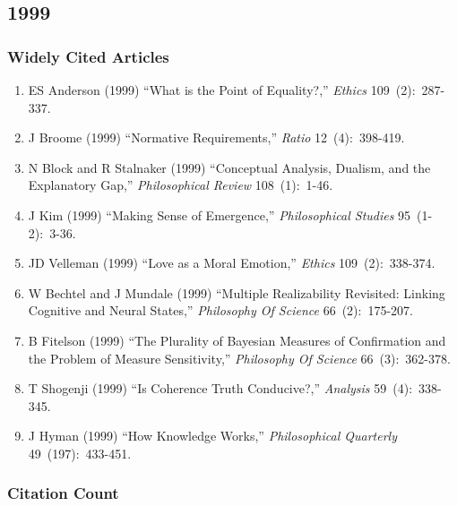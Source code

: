 \documentclass[
  10pt,
  letterpaper,
  DIV=11,
  numbers=noendperiod,
  twoside]{scrartcl}
\providecommand{\tightlist}{%
  \setlength{\itemsep}{0pt}\setlength{\parskip}{0pt}}\usepackage{longtable,booktabs,array}
\begin{document}
\newpage

\subsection{1999}\label{sec-s1999}

\subsubsection*{Widely Cited Articles}\label{widely-cited-articles-42}

\begin{enumerate}
\def\labelenumi{\arabic{enumi}.}
\tightlist
\item
  ES Anderson (1999) ``What is the Point of Equality?,'' \emph{Ethics}
  109~(2):~287-337.
\item
  J Broome (1999) ``Normative Requirements,'' \emph{Ratio}
  12~(4):~398-419.
\item
  N Block and R Stalnaker (1999) ``Conceptual Analysis, Dualism, and the
  Explanatory Gap,'' \emph{Philosophical Review} 108~(1):~1-46.
\item
  J Kim (1999) ``Making Sense of Emergence,'' \emph{Philosophical
  Studies} 95~(1-2):~3-36.
\item
  JD Velleman (1999) ``Love as a Moral Emotion,'' \emph{Ethics}
  109~(2):~338-374.
\item
  W Bechtel and J Mundale (1999) ``Multiple Realizability Revisited:
  Linking Cognitive and Neural States,'' \emph{Philosophy Of Science}
  66~(2):~175-207.
\item
  B Fitelson (1999) ``The Plurality of Bayesian Measures of Confirmation
  and the Problem of Measure Sensitivity,'' \emph{Philosophy Of Science}
  66~(3):~362-378.
\item
  T Shogenji (1999) ``Is Coherence Truth Conducive?,'' \emph{Analysis}
  59~(4):~338-345.
\item
  J Hyman (1999) ``How Knowledge Works,'' \emph{Philosophical Quarterly}
  49~(197):~433-451.
\end{enumerate}

\subsubsection*{Citation Count}\label{sec-count-1999}
\end{document}
